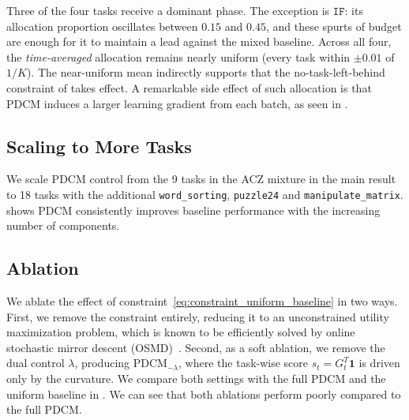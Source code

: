 Three of the four tasks receive a dominant phase. The
exception is $\texttt{IF}$: its allocation proportion oscillates between $0.15$ and $0.45$, and these spurts of
budget are enough for it to maintain a lead against the mixed baseline. Across all
four, the \emph{time-averaged} allocation remains nearly uniform (every task
within $\pm0.01$ of $1/K$). The near-uniform mean indirectly supports that the
no-task-left-behind constraint of  takes effect. A remarkable side effect of such allocation is that PDCM induces a larger learning gradient from each batch, as seen in .

\vspace{-0.05in}
\subsection{Scaling to More Tasks}
\label{sec:scaling}
\vspace{-0.05in}

We scale PDCM control from the 9 tasks in the ACZ mixture in the main result to 18 tasks with the additional \texttt{word\_sorting}, \texttt{puzzle24} and \texttt{manipulate\_matrix}.  shows PDCM consistently improves baseline performance with the increasing number of components.

\vspace{-0.05in}
\subsection{Ablation}
\vspace{-0.05in}
\label{sec:ablation}


We ablate the effect of constraint~\ref{eq:constraint_uniform_baseline} in two ways. First, we remove the constraint entirely, reducing it to an unconstrained utility maximization problem, which is known to be efficiently solved by online stochastic mirror descent (OSMD)~\citep{audibert2013regretonlinecombinatorialoptimization}. Second, as a soft ablation, we remove the dual control $\lambda$, producing $\mathrm{PDCM}_{-\lambda}$, where the task-wise score $s_t = G_t^T \mathbf{1}$ is driven only by the curvature. We compare both settings with the full PDCM and the uniform baseline in . We can see that both ablations perform poorly compared to the full PDCM.

